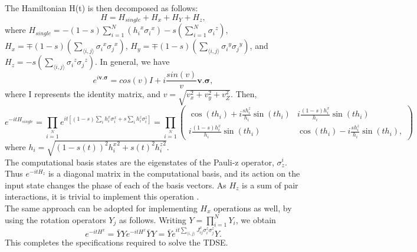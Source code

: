 \documentclass[../main.tex]{subfiles}
\begin{document}
The Hamiltonian H(t) is then decomposed as follows:
\begin{equation}
H=H_{single}+H_x+H_Y+H_z, \label{eq:b20}
\end{equation}
where $H_{single}=-(1-s){\textstyle\sum}_{i=1}^{N}({h_i}^x{\sigma_i}^x )-s({\textstyle\sum}_{i=1}^{N}{\sigma_i}^z)$, $H_x= \mp (1-s) ( {\textstyle\sum}_{\langle i,j\rangle}{\sigma_i}^x{\sigma_j}^x)$, $H_y= \mp (1-s) ({\textstyle\sum}_{\langle i,j\rangle}{\sigma_i}^y{\sigma_j}^y)$, and $H_z= -s ({\textstyle\sum}_{\langle i,j\rangle}{\sigma_i}^z{\sigma_j}^z )$. In general, we have
\begin{equation}
e^{i \mathbf{v.\sigma}}=cos(v) I +i \frac{sin(v)}{v}\mathbf{v.\sigma},
\end{equation}
where I represents the identity matrix, and $v=\sqrt{v_x^2 +v_y^2 +v_Z^2}$. Then, 
\begin{equation}
e^{-itH_{single}}=\prod \limits_{i=1} \limits^{N} e^{it[(1-s)\sum \limits_i h_i^x \sigma_i^x +s \sum \limits_{i} h_i^z \sigma_i^z]} = \prod \limits_{i=1} \limits^{N} \begin{pmatrix}
\cos(th_i) +i \frac{sh_i^z}{h_i} \sin(th_i) &  i \frac{(1-s)h_i^x}{h_i} \sin(th_i)\\
i \frac{(1-s)h_i^x}{h_i}\sin(th_i) & \cos(th_i) -i \frac{sh_i^z}{h_i} \sin(th_i),
\end{pmatrix}
\end{equation}
where $h_i=\sqrt{(1-s(t))^2 {h_i^x}^2 + s(t)^2 {h_i^z}^2}$.\\

The computational basis states are the eigenstates of the Pauli-z operator, $\sigma^i_z$. Thus $e^{-itH_z}$ is a diagonal matrix in the computational basis, and its action on the input state changes the phase of each of the basis vectors. As $H_z$ is a sum of pair interactions, it is trivial to implement this operation \cite{de2004computational}.\\

The same approach can be adopted for implementing $H_x$ operations as well, by using the rotation operators $Y_j$ as follows. Writing $Y={\textstyle\prod}_{i=1}^{N} Y_i$, we obtain
\begin{equation}
e^{-itH^x}=\bar{Y}Y e^{-itH^x}\bar{Y}Y=\bar{Y}e^{it \sum \limits_{\langle i,j \rangle} J_{ij}^x \sigma_i^z \sigma_j^z} Y.
\end{equation}
This completes the specifications required to solve the TDSE.
\end{document}
